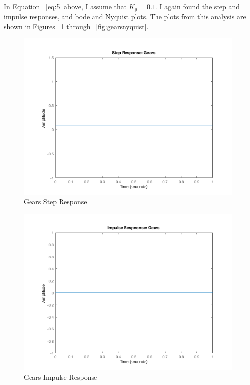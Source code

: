 \documentclass[12pt]{article}
\begin{document}
In Equation ~\ref{eq:5} above, I assume that $K_{g} = 0.1$. I again found the step and impulse responses, and bode and Nyquist plots. The plots from this analysis are shown in Figures ~\ref{fig:gearsstep} through ~\ref{fig:gearsnyquist}.

\begin{figure}[H]
\begin{center}
	\includegraphics[width=\textwidth]{./img/GearsStep.png}
	\caption{\label{fig:gearsstep}Gears Step Response}
\end{center}
\end{figure}

\begin{figure}[H]
\begin{center}
	\includegraphics[width=\textwidth]{./img/GearsImpulse.png}
	\caption{\label{fig:gearsimpulse}Gears Impulse Response}
\end{center}
\end{figure}
\end{document}
